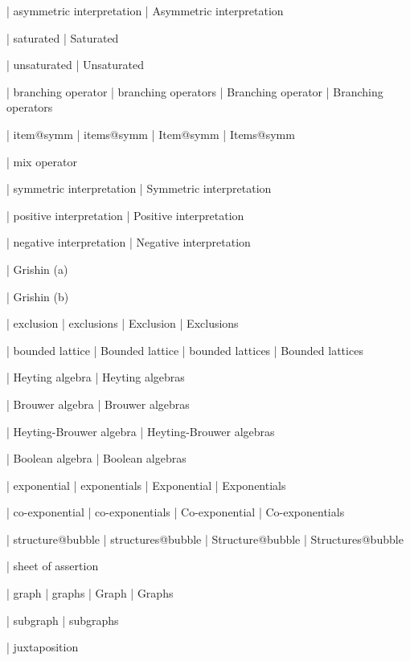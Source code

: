  | asymmetric interpretation
 | Asymmetric interpretation

 | saturated
 | Saturated

 | unsaturated
 | Unsaturated

 | branching operator
 | branching operators
 | Branching operator
 | Branching operators

 | item@symm
 | items@symm
 | Item@symm
 | Items@symm

 | mix operator
 
 | symmetric interpretation
 | Symmetric interpretation

 | positive interpretation
 | Positive interpretation

 | negative interpretation
 | Negative interpretation

 | Grishin (a)

 | Grishin (b)

 | exclusion
 | exclusions
 | Exclusion
 | Exclusions
 
 | bounded lattice
 | Bounded lattice
 | bounded lattices
 | Bounded lattices

 | Heyting algebra
 | Heyting algebras

 | Brouwer algebra
 | Brouwer algebras

 | Heyting-Brouwer algebra
 | Heyting-Brouwer algebras

 | Boolean algebra
 | Boolean algebras

 | exponential
 | exponentials
 | Exponential
 | Exponentials

 | co-exponential
 | co-exponentials
 | Co-exponential
 | Co-exponentials

 | structure@bubble
 | structures@bubble
 | Structure@bubble
 | Structures@bubble


 | sheet of assertion
 
 | graph
 | graphs
 | Graph
 | Graphs

 | subgraph
 | subgraphs

 | juxtaposition

